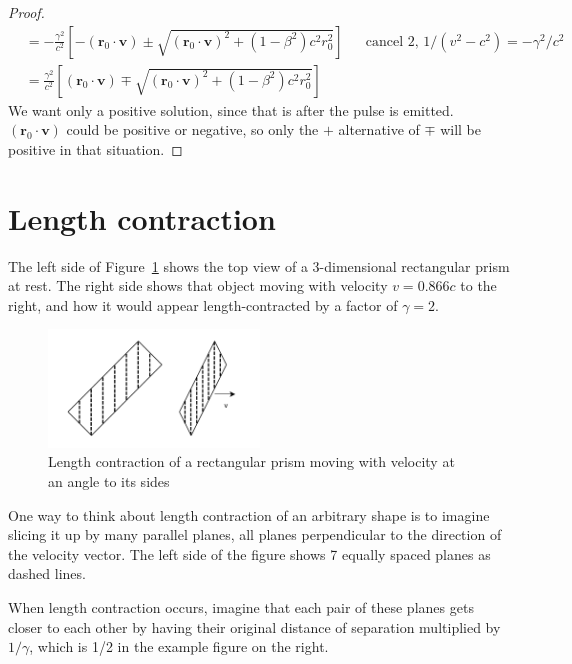 \documentclass[a4paper]{article}
\theoremstyle{plain}
\theoremstyle{definition}
\newcommand{\vect}[1]{\mathbf{#1}}
\begin{document}
\begin{proof}
\begin{align*}
  & = -\frac{\gamma^2}{c^2} \left[ -(\vect{r}_0 \cdot \vect{v}) \pm \sqrt{(\vect{r}_0 \cdot \vect{v})^2 + (1-\beta^2)c^2 r_0^2} \right] & & \text{cancel 2, $1/(v^2-c^2) = -\gamma^2/c^2$} \\
  & = \frac{\gamma^2}{c^2} \left[ (\vect{r}_0 \cdot \vect{v}) \mp \sqrt{(\vect{r}_0 \cdot \vect{v})^2 + (1-\beta^2)c^2 r_0^2} \right]
\end{align*}
We want only a positive solution, since that is after the pulse is
emitted.  $(\vect{r}_0 \cdot \vect{v})$ could be positive or negative,
so only the $+$ alternative of $\mp$ will be positive in that
situation.
\end{proof}


\section{Length contraction}
\label{app:length-contraction}

The left side of Figure~\ref{fig:diagonal-length-contraction} shows
the top view of a 3-dimensional rectangular prism at rest.  The right
side shows that object moving with velocity $v=0.866c$ to the right,
and how it would appear length-contracted by a factor of $\gamma=2$.
\begin{figure}[ht]
	\centering
	\includegraphics[width=0.5\textwidth]{length-contraction-rectangle-at-angle-cropped.pdf}
	\caption{Length contraction of a rectangular prism moving with velocity at an angle to its sides}
	\label{fig:diagonal-length-contraction}
\end{figure}

One way to think about length contraction of an arbitrary shape is to
imagine slicing it up by many parallel planes, all planes
perpendicular to the direction of the velocity vector.  The left side
of the figure shows 7 equally spaced planes as dashed lines.

When length contraction occurs, imagine that each pair of these planes
gets closer to each other by having their original distance of
separation multiplied by $1/\gamma$, which is 1/2 in the example
figure on the right.
\end{document}
